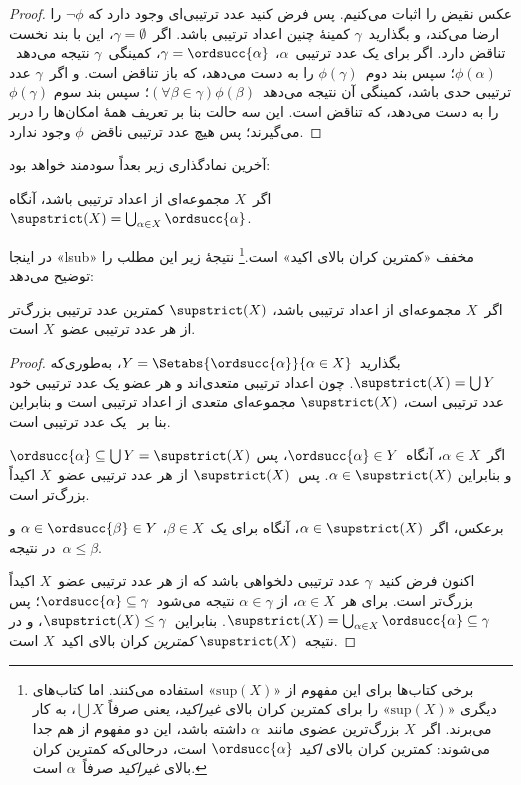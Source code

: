 \documentclass[../../../include/open-logic-section]{subfiles}
\begin{document}
\begin{proof}
عکس نقیض را اثبات می‌کنیم. پس فرض کنید عدد ترتیبی‌ای وجود دارد که
$\lnot\phi$ را ارضا می‌کند، و بگذارید~$\gamma$ کمینهٔ چنین اعداد ترتیبی
باشد. اگر~$\gamma=\emptyset$، این با بند نخست تناقض دارد. اگر برای یک عدد
ترتیبی~$\alpha$، $\gamma=\ordsucc{\alpha}$، کمینگی~$\gamma$ نتیجه
می‌دهد~$\phi(\alpha)$؛ سپس بند دوم~$\phi(\gamma)$ را به دست می‌دهد،
که باز تناقض است. و اگر~$\gamma$ عدد ترتیبی حدی باشد، کمینگی آن نتیجه
می‌دهد~$(\forall \beta \in \gamma)\phi(\beta)$؛ سپس بند سوم
$\phi(\gamma)$ را به دست می‌دهد، که تناقض است. این سه حالت بنا بر تعریف
همهٔ امکان‌ها را دربر می‌گیرند؛ پس هیچ عدد ترتیبی ناقض~$\phi$ وجود ندارد.
\end{proof}
\noindent
آخرین نمادگذاری زیر بعداً سودمند خواهد بود:

\begin{defn}
اگر~$X$ مجموعه‌ای از اعداد ترتیبی باشد، آنگاه
$\supstrict(X)=\bigcup_{\alpha \in X}\ordsucc{\alpha}$.
\end{defn}
\noindent
در اینجا «lsub» مخفف «کمترین کران بالای اکید» است.\footnote{برخی کتاب‌ها
برای این مفهوم از «$\text{sup}(X)$» استفاده می‌کنند. اما کتاب‌های دیگری
«$\text{sup}(X)$» را برای کمترین کران بالای \emph{غیراکید}، یعنی صرفاً
$\bigcup X$، به کار می‌برند. اگر~$X$ بزرگ‌ترین عضوی مانند~$\alpha$ داشته
باشد، این دو مفهوم از هم جدا می‌شوند: کمترین کران بالای \emph{اکید}
$\ordsucc{\alpha}$ است، درحالی‌که کمترین کران بالای \emph{غیراکید}
صرفاً~$\alpha$ است.} نتیجهٔ زیر این مطلب را توضیح می‌دهد:

\begin{prop}
اگر~$X$ مجموعه‌ای از اعداد ترتیبی باشد، $\supstrict(X)$ کمترین عدد ترتیبی
بزرگ‌تر از هر عدد ترتیبی عضو~$X$ است.
\end{prop}

\begin{proof}
بگذارید~$Y=\Setabs{\ordsucc{\alpha}}{\alpha \in X}$، به‌طوری‌که
$\supstrict(X)=\bigcup Y$. چون اعداد ترتیبی متعدی‌اند و هر عضو یک عدد
ترتیبی خود عدد ترتیبی است، $\supstrict(X)$ مجموعه‌ای متعدی از اعداد
ترتیبی است و بنابراین بنا بر~ یک عدد
ترتیبی است.

اگر~$\alpha\in X$، آنگاه~$\ordsucc{\alpha}\in Y$، پس
$\ordsucc{\alpha}\subseteq\bigcup Y=\supstrict(X)$ و بنابراین
$\alpha\in\supstrict(X)$. پس~$\supstrict(X)$ از هر عدد ترتیبی عضو~$X$
اکیداً بزرگ‌تر است.

برعکس، اگر~$\alpha\in\supstrict(X)$، آنگاه برای یک~$\beta\in X$،
$\alpha\in\ordsucc{\beta}\in Y$ و در نتیجه~$\alpha\leq\beta$.

اکنون فرض کنید~$\gamma$ عدد ترتیبی دلخواهی باشد که از هر عدد ترتیبی
عضو~$X$ اکیداً بزرگ‌تر است. برای هر~$\alpha\in X$، از
$\alpha\in\gamma$ نتیجه می‌شود~$\ordsucc{\alpha}\subseteq\gamma$؛ پس
$\supstrict(X)=\bigcup_{\alpha \in X}\ordsucc{\alpha}\subseteq\gamma$.
بنابراین~$\supstrict(X)\leq\gamma$، و در نتیجه~$\supstrict(X)$
\emph{کمترین} کران بالای اکید~$X$ است.
\end{proof}
\end{document}
